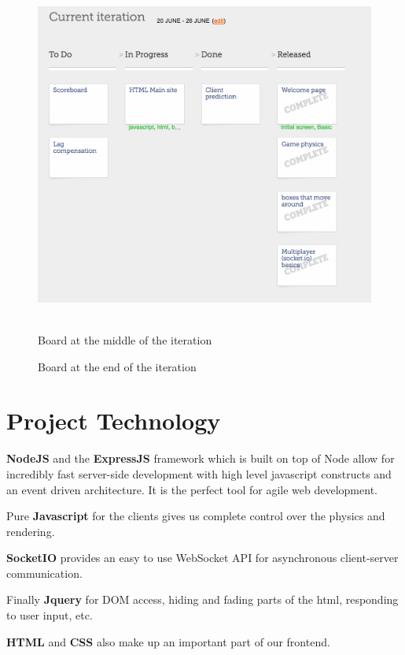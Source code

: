 \documentclass{article}
\renewcommand{\_}{\char`_}
\begin{document}
\begin{figure}[h!]
                \hbox{%
                        \includegraphics[height=\ht0]{end}%
                }%
        \fi
        \noindent
        \parbox{.45\textwidth}{%
                \centering
                \caption{Board at the middle of the iteration}
                \label{fg:middle}
        }%
        \hfil
        \parbox{.45\textwidth}{%
                \centering
                \caption{Board at the end of the iteration}
                \label{fg:end}
        }%
\end{figure}

\clearpage
\section{Project Technology}

\textbf{NodeJS} and the \textbf{ExpressJS} framework which is built on top of 
Node allow for incredibly fast server-side development with 
high level javascript constructs and an event driven architecture.
It is the perfect tool for agile web development.

Pure \textbf{Javascript} for the clients gives us complete control over the 
physics and rendering.

\textbf{SocketIO} provides an easy to use WebSocket API for asynchronous
client-server communication.

Finally \textbf{Jquery} for DOM access, hiding and fading parts of the html, 
responding to user input, etc.

\textbf{HTML} and \textbf{CSS} also make up an important part of our frontend.

\end{document}
